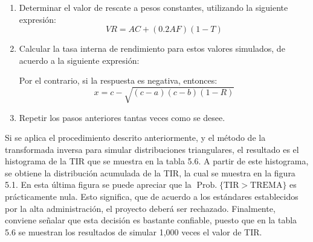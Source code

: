 \documentclass[11pt,letterpaper]{report}
\newcommand{\Prob}{\operatorname{Prob.}}
\begin{document}
\begin{enumerate}[label=\arabic*.]
\item Determinar el valor de rescate a pesos constantes, utilizando la
siguiente expresión:
\[
VR = AC + (0.2AF)(1-T)
\]

\item Calcular la tasa interna de rendimiento para estos valores simulados,
de acuerdo a la siguiente expresión:

Por el contrario, si la respuesta es negativa, entonces:
\[
x = c - \sqrt{(c-a)(c-b)(1-R)}
\]

\item Repetir los pasos anteriores tantas veces como se desee.
\end{enumerate}

Si se aplica el procedimiento descrito anteriormente, y el método de la
transformada inversa para simular distribuciones triangulares, el resultado
es el histograma de la TIR que se muestra en la tabla 5.6. A partir de este
histograma, se obtiene la distribución acumulada de la TIR, la cual se
muestra en la figura 5.1. En esta última figura se puede apreciar que la
$\Prob\{\text{TIR} > \text{TREMA}\}$ es prácticamente nula. Esto significa,
que de acuerdo a los estándares establecidos por la alta administración, el
proyecto deberá ser rechazado. Finalmente, conviene señalar que esta
decisión es bastante confiable, puesto que en la tabla 5.6 se muestran los
resultados de simular 1,000 veces el valor de TIR.
\end{document}

